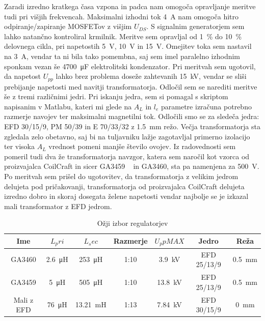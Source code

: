 \documentclass[a4paper,twoside,openright,12pt,Slovene]{book}
\begin{document}
Zaradi izredno kratkega časa vzpona in padca nam omogoča opravljanje meritve tudi pri višjih frekvencah. Maksimalni izhodni tok \SI{4}{\ampere} nam omogoča hitro odpiranje/zapiranje MOSFETov z višjim \(U_{DS}\). S signalnim generatorjem sem lahko natančno kontroliral krmilnik. Meritve sem opravljal od \SI{1}{\percent} do \SI{10}{\percent} delovnega cikla, pri napetostih \SI{5}{\volt}, \SI{10}{\volt} in \SI{15}{\volt}. Omejitev toka sem nastavil na \SI{3}{\ampere}, vendar ta ni bila tako pomembna, saj sem imel paralelno izhodnim sponkam vezan še \SI{4700}{\micro\farad} elektrolitski kondenzator. Pri meritvah sem ugotovil, da napetost \(U_{pp}\) lahko brez problema doseže zahtevanih \SI{15}{\kilo\volt}, vendar se sliši prebijanje napetosti med navitji transformatorja. Odločil sem se narediti meritve še z tremi različnimi jedri. Pri iskanju jedra, sem si pomagal s skriptom napisanim v Matlabu, kateri mi glede na \(A_L\) in \(l_e\) parametre izračuna potrebno razmerje navojev ter maksimalni magnetilni tok. Odločili smo se za sledeča jedra: EFD 30/15/9, PM 50/39 in E 70/33/32 z \SI{1.5}{\milli\meter} režo. Večja transformatorja sta zgledala zelo obetavno, saj bi na tuljavniku lažje zagotavljal primerno izolacijo ter visoka \(A_L\) vrednost pomeni manjše število ovojev. Iz radovednosti sem pomeril tudi dva že transformatorja navzgor, katera sem naročil kot vzorca od proizvajalca CoilCraft in sicer GA3459 ~\cite{Coilcraft:GA3459} in GA3460, sta pa namenjena za \SI{500}{\volt}. Po meritvah sem prišel do ugotovitev, da transformatorja z velikim jedrom delujeta pod pričakovanji, transformatorja od proizvajalca CoilCraft delujeta izredno dobro in skoraj dosegata želene napetosti vendar najbolje se je izkazal mali transformator z EFD jedrom. 
 
\begin{table}[h!]
\centering
\begin{tabular}{||c|c|c|c|c|c|c||}
\hline
Ime & \(L_pri\) & \(L_sec\) & Razmerje & \(U_ppMAX\) & Jedro & Reža \\ [0.5ex]
\hline\hline
GA3460 & \SI{2.6}{\micro\henry} & \SI{253}{\micro\henry} & 1:10 & \SI{3.9}{\kilo\volt} & EFD 25/13/9 & \SI{0.5}{\milli\meter} \\
\hline
GA3459 & \SI{5}{\micro\henry} & \SI{505}{\micro\henry} & 1:10 & \SI{13.8}{\kilo\volt} & EFD 25/13/9 & \SI{0.5}{\milli\meter} \\
\hline
Mali z EFD & \SI{76}{\micro\henry} & \SI{13.21}{\milli\henry} & 1:13 & \SI{7.84}{\kilo\volt} & EFD 30/15/9 & \SI{0}{\milli\meter} \\
\hline
\end{tabular}

\caption{Ožji izbor regulatorjev}

\end{table}
\end{document}
